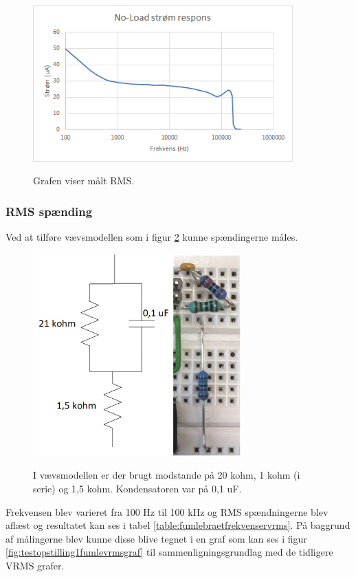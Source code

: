 \begin{figure}[H]
\centering
{\includegraphics[width=10cm]
{Figure/testopstilling1fumlenoloadgraf}}
\caption{Grafen viser målt RMS.}
\label{fig:testopstilling1fumlenoloadgraf}
\end{figure}


\subsubsection{RMS spænding}
Ved at tilføre vævsmodellen som i figur \ref{fig:testopstilling1fumlevaevs} kunne spændingerne måles.


\begin{figure}[H]
\centering
{\includegraphics[width=8cm]
{Figure/testopstilling1fumlevaevs}}
\caption{I vævsmodellen er der brugt modstande på 20 kohm, 1 kohm (i serie) og 1,5 kohm. Kondensatoren var på 0,1 uF.}
\label{fig:testopstilling1fumlevaevs}
\end{figure}

Frekvensen blev varieret fra 100 Hz til 100 kHz og RMS spændningerne blev aflæst og resultatet kan ses i tabel \ref{table:fumlebraetfrekvenservrms}. På baggrund af målingerne blev kunne disse blive tegnet i en graf som kan ses i figur \ref{fig:testopstilling1fumlevrmsgraf} til sammenligningsgrundlag med de tidligere VRMS grafer.

